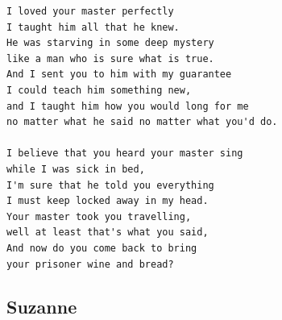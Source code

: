 \documentclass[a4paper]{article}
\begin{document}
\begin{Verbatim}[commandchars=\\\{\}]
I loved your master perfectly 
I taught him all that he knew. 
He was starving in some deep mystery 
like a man who is sure what is true. 
And I sent you to him with my guarantee 
I could teach him something new, 
and I taught him how you would long for me 
no matter what he said no matter what you'd do. 

I believe that you heard your master sing 
while I was sick in bed, 
I'm sure that he told you everything 
I must keep locked away in my head. 
Your master took you travelling, 
well at least that's what you said, 
And now do you come back to bring 
your prisoner wine and bread? 

\end{Verbatim}
\newpage
\subsection{Suzanne}
\end{document}
